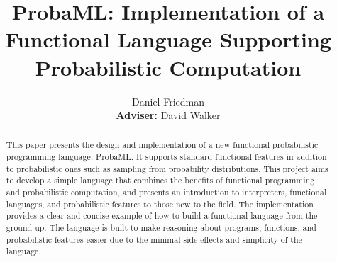 \documentclass[pageno]{jpaper}
\begin{document}
\thispagestyle{empty}

\title{
  ProbaML: Implementation of a Functional Language Supporting Probabilistic Computation}

\author{Daniel Friedman\\\textbf{Adviser:} David Walker}

\date{}
\maketitle

\thispagestyle{empty}
\doublespacing


\begin{abstract}
  This paper presents the design and implementation of a new functional probabilistic programming language, ProbaML. It supports standard functional features in addition to probabilistic ones such as sampling from probability distributions. This project aims to develop a simple language that combines the benefits of functional programming and probabilistic computation, and presents an introduction to interpreters, functional languages, and probabilistic features to those new to the field. The implementation provides a clear and concise example of how to build a functional language from the ground up. The language is built to make reasoning about programs, functions, and probabilistic features easier due to the minimal side effects and simplicity of the language.
\end{abstract}
\end{document}
